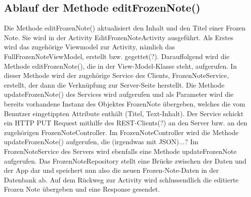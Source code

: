 \subsection{Ablauf der Methode editFrozenNote()}

Die Methode editFrozenNote() aktualisiert den Inhalt und den Titel einer Frozen Note. Sie wird in der Activity EditFrozenNoteActivity ausgeführt. Als Erstes wird das zugehörige Viewmodel zur Activity, nämlich das FullFrozenNoteViewModel, erstellt bzw. gegettet(?). Darauffolgend wird die Methode editFrozenNote(), die in der View-Model-Klasse steht, aufgerufen. In dieser Methode wird der zugehörige Service des Clients, FrozenNoteService, erstellt, der dann die Verknüpfung zur Server-Seite herstellt. Die Methode updateFrozenNote() des Services wird aufgerufen und als Parameter wird die bereits vorhandene Instanz des Objektes FrozenNote übergeben, welches die vom Benutzer eingetippten Attribute enthält (Titel, Text-Inhalt). Der Service schickt ein HTTP PUT Request mithilfe des REST-Clients(?) an den Server bzw. an den zugehörigen FrozenNoteController. Im FrozenNoteController wird die Methode updateFrozenNote() aufgerufen, die (irgendwas mit JSON)...? Im FrozenNoteService des Servers wird ebenfalls eine Methode updateFrozenNote aufgerufen. Das FrozenNoteRepository stellt eine Brücke zwischen der Daten und der App dar und speichert nun also die neuen Frozen-Note-Daten in der Datenbank ab. Auf dem Rückweg zur Activity wird schlussendlich die editierte Frozen Note übergeben und eine Response gesendet.